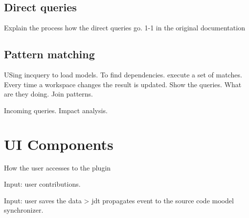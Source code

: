 \subsection{Direct queries}
Explain the process how the direct queries go.
1-1 in the original documentation

\subsection{Pattern matching}
USing incquery to load models. To find dependencies. execute a set of matches.
Every time a workspace changes the result is updated.
Show the queries. What are they doing.
Join patterns.

Incoming queries. 
Impact analysis.



\section{UI Components}
How the user accesses to the  plugin

Input: user contributions.

Input: user saves the data > jdt propagates event to the source code moodel synchronizer.


